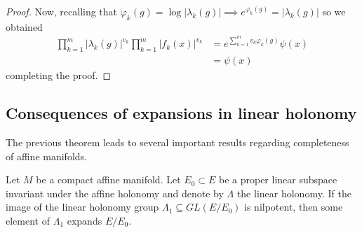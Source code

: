 \begin{proof}
    Now, recalling that $ \varphi_k(g) = \log|\lambda_k(g)| \implies
        e^{\varphi_k(g)}= |\lambda_k(g)|$ so we obtained
    \begin{align*}
        \prod_{k=1}^{m}|\lambda_k(g)|^{v_k}\prod_{k=1}^{m}|f_k(x)|^{v_k} & = e^{\sum_{k=1}^{m}v_k\varphi_k(g)}\psi(x) \\
                                                                         & = \psi(x)
    \end{align*}
    completing the proof.
\end{proof}

\subsection{Consequences of expansions in linear holonomy}
The previous theorem leads to several important results regarding completeness
of affine manifolds.
\begin{theorem}
    Let $M$ be a compact affine manifold. Let $E_0 \subset E$ be a proper linear subspace invariant
    under the affine holonomy and denote by $\Lambda$ the linear holonomy. If the image of the linear holonomy group $\Lambda_1 \subseteq GL(E/E_0)$ is nilpotent,
    then some element of $\Lambda_1$ expands $E/E_0$. \label{thm:expansion-in-holonomy}
\end{theorem}

